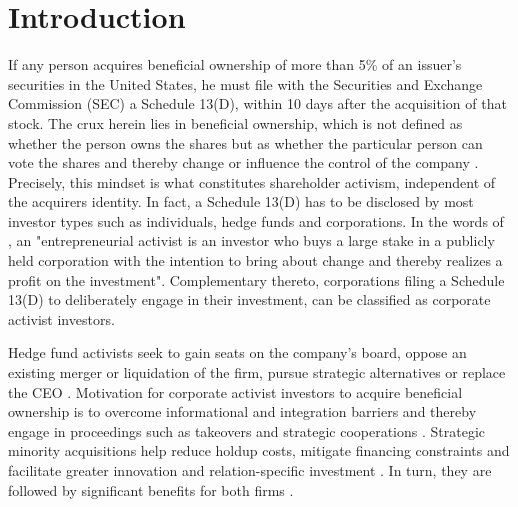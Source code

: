 \documentclass[12pt]{article}
\renewcommand{\baselinestretch}{1.5}
\newcounter{savepage}
\begin{document}
\renewcommand{\baselinestretch}{1.5}\normalsize
\cleardoublepage
{}


\section{Introduction}

\noindent If any person acquires beneficial ownership of more than 5\% of an issuer's securities in the United States, he must file with the Securities and Exchange Commission (SEC) a Schedule 13(D), within 10 days after the acquisition of that stock. The crux herein lies in beneficial ownership, which is not defined as whether the person owns the shares but as whether the particular person can vote the shares and thereby change or influence the control of the company \citep[p.24]{Morrison2015}. Precisely, this mindset is what constitutes shareholder activism, independent of the acquirers identity. In fact, a Schedule 13(D) has to be disclosed by most investor types such as individuals, hedge funds and corporations. In the words of \citet[p.187]{Klein2009}, an "entrepreneurial activist is an investor who buys a large stake in a publicly held corporation with the intention to bring about change and thereby realizes a profit on the investment". Complementary thereto, corporations filing a Schedule 13(D) to deliberately engage in their investment, can be classified as corporate activist investors.\par
Hedge fund activists seek to gain seats on the company's board, oppose an existing merger or liquidation of the firm, pursue strategic alternatives or replace the CEO \citep[p.188]{Klein2009}. Motivation for corporate activist investors to acquire beneficial ownership is to overcome informational and integration barriers and thereby engage in proceedings such as takeovers and strategic cooperations \citep[p.1]{Huang2017}. Strategic minority acquisitions help reduce holdup costs, mitigate financing constraints and facilitate greater innovation and relation-specific investment \citep[p.825]{Wang2014}. In turn, they are followed by significant benefits for both firms \citep[p.2793]{Allen2000}.\par
\end{document}
